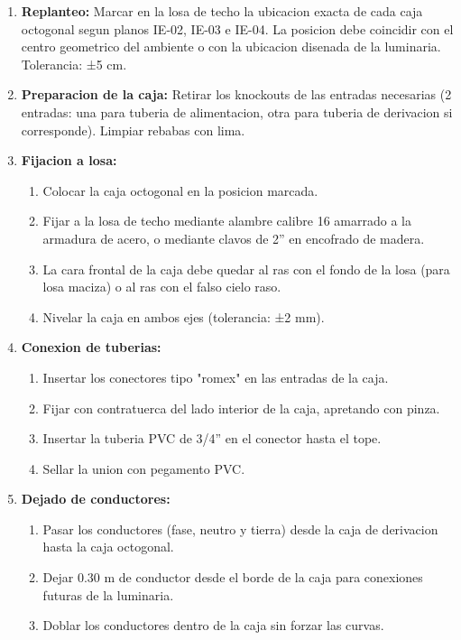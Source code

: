 \begin{enumerate}
  \item \textbf{Replanteo:} Marcar en la losa de techo la ubicacion exacta de cada caja octogonal segun planos IE-02, IE-03 e IE-04. La posicion debe coincidir con el centro geometrico del ambiente o con la ubicacion disenada de la luminaria. Tolerancia: ±5 cm.
  \item \textbf{Preparacion de la caja:} Retirar los knockouts de las entradas necesarias (2 entradas: una para tuberia de alimentacion, otra para tuberia de derivacion si corresponde). Limpiar rebabas con lima.
  \item \textbf{Fijacion a losa:}
  \begin{enumerate}
    \item Colocar la caja octogonal en la posicion marcada.
    \item Fijar a la losa de techo mediante alambre calibre 16 amarrado a la armadura de acero, o mediante clavos de 2'' en encofrado de madera.
    \item La cara frontal de la caja debe quedar al ras con el fondo de la losa (para losa maciza) o al ras con el falso cielo raso.
    \item Nivelar la caja en ambos ejes (tolerancia: ±2 mm).
  \end{enumerate}
  \item \textbf{Conexion de tuberias:}
  \begin{enumerate}
    \item Insertar los conectores tipo "romex" en las entradas de la caja.
    \item Fijar con contratuerca del lado interior de la caja, apretando con pinza.
    \item Insertar la tuberia PVC de 3/4'' en el conector hasta el tope.
    \item Sellar la union con pegamento PVC.
  \end{enumerate}
  \item \textbf{Dejado de conductores:}
  \begin{enumerate}
    \item Pasar los conductores (fase, neutro y tierra) desde la caja de derivacion hasta la caja octogonal.
    \item Dejar 0.30 m de conductor desde el borde de la caja para conexiones futuras de la luminaria.
    \item Doblar los conductores dentro de la caja sin forzar las curvas.
  \end{enumerate}

\end{enumerate}
